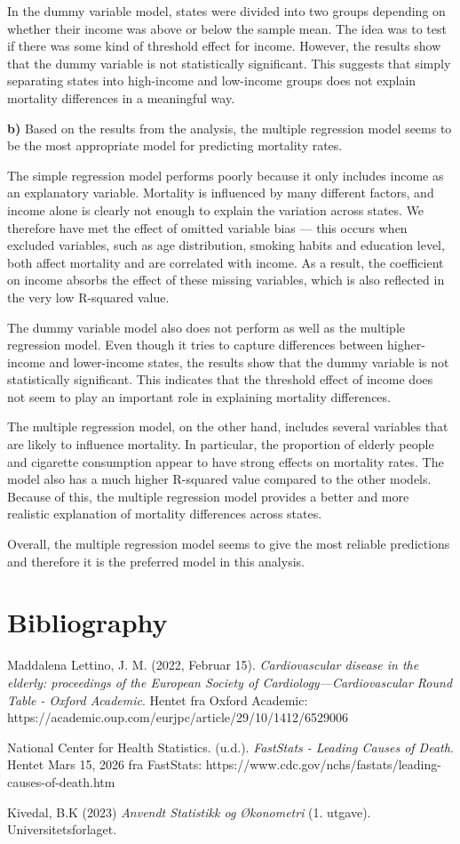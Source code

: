 \documentclass[
  letterpaper,
  DIV=11,
  numbers=noendperiod]{scrartcl}
\begin{document}
In the dummy variable model, states were divided into two groups
depending on whether their income was above or below the sample mean.
The idea was to test if there was some kind of threshold effect for
income. However, the results show that the dummy variable is not
statistically significant. This suggests that simply separating states
into high-income and low-income groups does not explain mortality
differences in a meaningful way. \newpage{}

\textbf{b)} Based on the results from the analysis, the multiple
regression model seems to be the most appropriate model for predicting
mortality rates.

The simple regression model performs poorly because it only includes
income as an explanatory variable. Mortality is influenced by many
different factors, and income alone is clearly not enough to explain the
variation across states. We therefore have met the effect of omitted
variable bias --- this occurs when excluded variables, such as age
distribution, smoking habits and education level, both affect mortality
and are correlated with income. As a result, the coefficient on income
absorbs the effect of these missing variables, which is also reflected
in the very low R-squared value.

The dummy variable model also does not perform as well as the multiple
regression model. Even though it tries to capture differences between
higher-income and lower-income states, the results show that the dummy
variable is not statistically significant. This indicates that the
threshold effect of income does not seem to play an important role in
explaining mortality differences.

The multiple regression model, on the other hand, includes several
variables that are likely to influence mortality. In particular, the
proportion of elderly people and cigarette consumption appear to have
strong effects on mortality rates. The model also has a much higher
R-squared value compared to the other models. Because of this, the
multiple regression model provides a better and more realistic
explanation of mortality differences across states.

Overall, the multiple regression model seems to give the most reliable
predictions and therefore it is the preferred model in this analysis.

\section{Bibliography}\label{bibliography}

Maddalena Lettino, J. M. (2022, Februar 15). \emph{Cardiovascular
disease in the elderly: proceedings of the European Society of
Cardiology---Cardiovascular Round Table - Oxford Academic}. Hentet fra
Oxford Academic:
https://academic.oup.com/eurjpc/article/29/10/1412/6529006

National Center for Health Statistics. (u.d.). \emph{FastStats - Leading
Causes of Death}. Hentet Mars 15, 2026 fra FastStats:
https://www.cdc.gov/nchs/fastats/leading-causes-of-death.htm

Kivedal, B.K (2023) \emph{Anvendt Statistikk og Økonometri} (1. utgave).
Universitetsforlaget.
\end{document}
